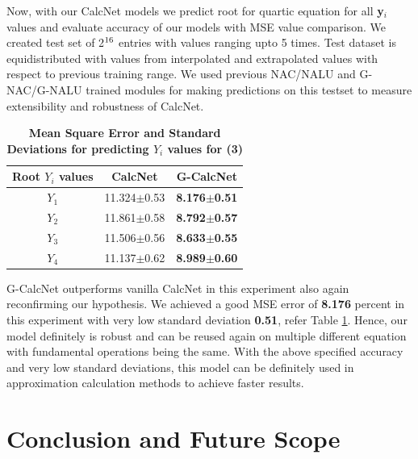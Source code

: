 \documentclass[conference]{IEEEtran}
\begin{document}
Now, with our CalcNet models we predict root for quartic equation for all \textbf{y\textit{$_i$}} values and evaluate accuracy of our models with MSE value comparison. We created test set of 2$\textsuperscript{16}$ entries with values ranging upto 5 times. Test dataset is equidistributed with values from interpolated and extrapolated values with respect to previous training range. We used previous NAC/NALU and G-NAC/G-NALU trained modules for making predictions on this testset to measure extensibility and robustness of CalcNet.

\bgroup
\def\arraystretch{1.5}
\begin{table}[h!]
  \begin{center}
    \caption{\textbf{Mean Square Error and Standard Deviations for predicting $Y_i$ values for (3)}}
    \label{tab:table4}
    \begin{tabular}{|c|c|c|}
    
    \hline
      \textbf{Root $Y_i$ values} & \textbf{CalcNet} & \textbf{G-CalcNet}\\
    \hline
      $Y_1$ & 11.324$\pm$0.53 & \textbf{8.176$\pm$0.51} \\
    \hline
      $Y_2$ & 11.861$\pm$0.58 & \textbf{8.792$\pm$0.57} \\
    \hline
      $Y_3$ & 11.506$\pm$0.56 & \textbf{8.633$\pm$0.55} \\
    \hline
      $Y_4$ & 11.137$\pm$0.62 & \textbf{8.989$\pm$0.60} \\

    \hline 
    \end{tabular}
  \end{center}
\end{table}
\egroup



G-CalcNet outperforms vanilla CalcNet in this experiment also again reconfirming our hypothesis. We achieved a good MSE error of \textbf{8.176} percent in this experiment with very low standard deviation \textbf{0.51}, refer Table \ref{tab:table4}. Hence, our model definitely is robust and can be reused again on multiple different equation with fundamental operations being the same. With the above specified accuracy and very low standard deviations, this model can be definitely used in approximation calculation methods to achieve faster results.

\section{Conclusion and Future Scope}
\end{document}
